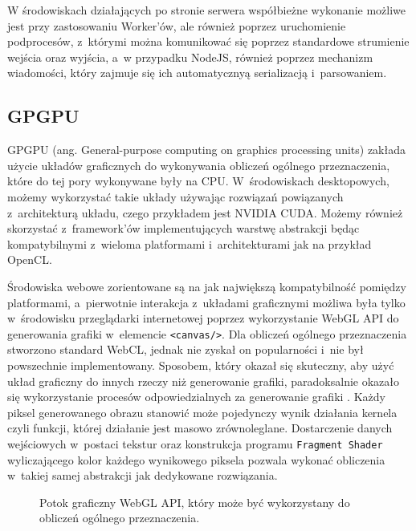 W środowiskach działających po stronie serwera współbieżne wykonanie możliwe jest przy zastosowaniu Worker'ów, ale również poprzez uruchomienie podprocesów, z~którymi można komunikować się poprzez standardowe strumienie wejścia oraz wyjścia, a~w przypadku NodeJS, również poprzez mechanizm wiadomości, który zajmuje się ich automatycznyą serializacją i~parsowaniem. 
 
\subsection{GPGPU}

GPGPU (ang. General-purpose computing on graphics processing units) zakłada użycie układów graficznych do wykonywania obliczeń ogólnego przeznaczenia, które do tej pory wykonywane były na CPU. W~środowiskach desktopowych, możemy wykorzystać takie układy używając rozwiązań powiązanych z~architekturą układu, czego przykładem jest NVIDIA CUDA. Możemy również skorzystać z~framework'ów implementujących warstwę abstrakcji będąc kompatybilnymi z~wieloma platformami i~architekturami jak na przykład OpenCL. 

Środowiska webowe zorientowane są na jak największą kompatybilność pomiędzy platformami, a~pierwotnie interakcja z~układami graficznymi możliwa była tylko w~środowisku przeglądarki internetowej poprzez wykorzystanie WebGL API do generowania grafiki w~elemencie \lstinline{<canvas/>}. Dla obliczeń ogólnego przeznaczenia stworzono standard WebCL, jednak nie zyskał on popularności i~nie był powszechnie implementowany. Sposobem, który okazał się skuteczny, aby użyć układ graficzny do innych rzeczy niż generowanie grafiki, paradoksalnie okazało się wykorzystanie procesów odpowiedzialnych za generowanie grafiki \cite{sapuan2018general}. Każdy piksel generowanego obrazu stanowić może pojedynczy wynik działania kernela czyli funkcji, której działanie jest masowo zrównoleglane. Dostarczenie danych wejściowych w~postaci tekstur oraz konstrukcja programu \texttt{Fragment Shader} wyliczającego kolor każdego wynikowego piksela pozwala wykonać obliczenia w~takiej samej abstrakcji jak dedykowane rozwiązania. 

\begin{figure}
    \centering
    
    \caption{Potok graficzny WebGL API, który może być wykorzystany do obliczeń ogólnego przeznaczenia.}
    \label{fig:webgl-pipeline}
\end{figure}

